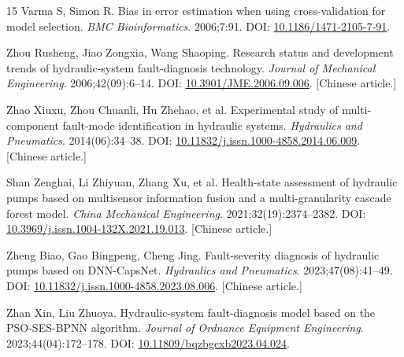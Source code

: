 \documentclass[11pt,a4paper]{article}
\begin{document}
\begin{thebibliography}{15}
 Varma S, Simon R. Bias in error estimation when using cross-validation for model selection. \emph{BMC Bioinformatics}. 2006;7:91. DOI: \href{https://doi.org/10.1186/1471-2105-7-91}{10.1186/1471-2105-7-91}.

 Zhou Rusheng, Jiao Zongxia, Wang Shaoping. Research status and development trends of hydraulic-system fault-diagnosis technology. \emph{Journal of Mechanical Engineering}. 2006;42(09):6--14. DOI: \href{https://doi.org/10.3901/JME.2006.09.006}{10.3901/JME.2006.09.006}. [Chinese article.]

 Zhao Xiuxu, Zhou Chuanli, Hu Zhehao, et al. Experimental study of multi-component fault-mode identification in hydraulic systems. \emph{Hydraulics and Pneumatics}. 2014(06):34--38. DOI: \href{https://doi.org/10.11832/j.issn.1000-4858.2014.06.009}{10.11832/j.issn.1000-4858.2014.06.009}. [Chinese article.]

 Shan Zenghai, Li Zhiyuan, Zhang Xu, et al. Health-state assessment of hydraulic pumps based on multisensor information fusion and a multi-granularity cascade forest model. \emph{China Mechanical Engineering}. 2021;32(19):2374--2382. DOI: \href{https://doi.org/10.3969/j.issn.1004-132X.2021.19.013}{10.3969/j.issn.1004-132X.2021.19.013}. [Chinese article.]

 Zheng Biao, Gao Bingpeng, Cheng Jing. Fault-severity diagnosis of hydraulic pumps based on DNN-CapsNet. \emph{Hydraulics and Pneumatics}. 2023;47(08):41--49. DOI: \href{https://doi.org/10.11832/j.issn.1000-4858.2023.08.006}{10.11832/j.issn.1000-4858.2023.08.006}. [Chinese article.]

 Zhan Xin, Liu Zhuoya. Hydraulic-system fault-diagnosis model based on the PSO-SES-BPNN algorithm. \emph{Journal of Ordnance Equipment Engineering}. 2023;44(04):172--178. DOI: \href{https://doi.org/10.11809/bqzbgcxb2023.04.024}{10.11809/bqzbgcxb2023.04.024}.
\end{thebibliography}
\end{document}
